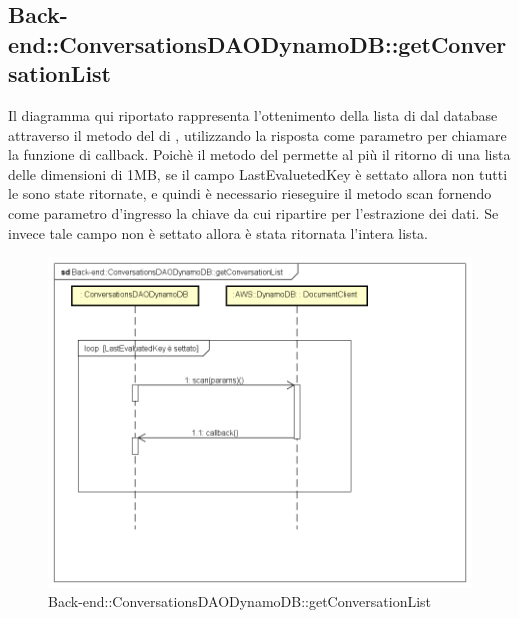 \subsection{Back-end::ConversationsDAODynamoDB::getConversationList}
Il diagramma qui riportato rappresenta l'ottenimento della lista di  dal database attraverso il metodo  del  di , utilizzando la risposta come parametro per chiamare la funzione di callback. Poichè il metodo  del  permette al più il ritorno di una lista delle dimensioni di 1MB, se il campo LastEvaluetedKey è settato allora non tutti le  sono state ritornate, e quindi è necessario rieseguire il metodo scan fornendo come parametro d'ingresso la chiave da cui ripartire per l'estrazione dei dati. Se invece tale campo non è settato allora è stata ritornata l'intera lista.
 \begin{figure}[h] \centering \includegraphics[width=\textwidth,height=\textheight,keepaspectratio]{images/diagrams/back-end/Ufficial_Backend/Back-endConversationsDAODynamoDBgetConversationList.png} 	\caption{Back-end::ConversationsDAODynamoDB::getConversationList}
\end{figure}
\newpage

